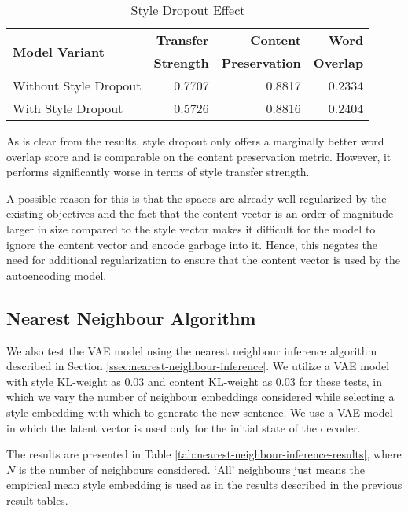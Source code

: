 \begin{table}[ht]
	\centering
	\begin{tabular}{| l | r | r | r |}
		\hline
		\multirow{2}{*}{
		\textbf{Model Variant}} & \textbf{Transfer} & \textbf{Content}      & \textbf{Word}    \\
		                        & \textbf{Strength} & \textbf{Preservation} & \textbf{Overlap} \\
		\hline
		\hline
		Without Style Dropout   & 0.7707            & 0.8817                & 0.2334           \\
		\hline
		With Style Dropout      & 0.5726            & 0.8816                & 0.2404           \\
		\hline
	\end{tabular}
	\caption{Style Dropout Effect}
	\label{tab:style-dropout-results}
\end{table}

As is clear from the results, style dropout only offers a marginally better word overlap score and is comparable on the content preservation metric. However, it performs significantly worse in terms of style transfer strength.

A possible reason for this is that the spaces are already well regularized by the existing objectives and the fact that the content vector is an order of magnitude larger in size compared to the style vector makes it difficult for the model to ignore the content vector and encode garbage into it. Hence, this negates the need for additional regularization to ensure that the content vector is used by the autoencoding model.

\subsection{Nearest Neighbour Algorithm}

We also test the VAE model using the nearest neighbour inference algorithm described in Section \ref{ssec:nearest-neighbour-inference}. We utilize a VAE model with style KL-weight as $0.03$ and content KL-weight as $0.03$ for these tests, in which we vary the number of neighbour embeddings considered while selecting a style embedding with which to generate the new sentence. We use a VAE model in which the latent vector is used only for the initial state of the decoder.

The results are presented in Table \ref{tab:nearest-neighbour-inference-results}, where $N$ is the number of neighbours considered. `All' neighbours just means the empirical mean style embedding is used as in the results described in the previous result tables.

